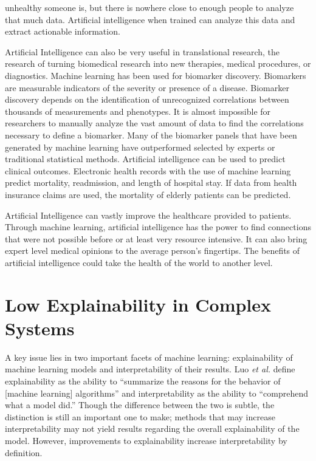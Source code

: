\documentclass[]{article}
\begin{document}
unhealthy someone is, but there is nowhere close to enough people to analyze that much data. Artificial intelligence when trained can analyze this data and extract actionable information.\cite{reddy2019artificial}

		Artificial Intelligence can also be very useful in translational research, the research of turning biomedical research into new therapies, medical procedures, or diagnostics. Machine learning has been used for biomarker discovery. Biomarkers are measurable indicators of the severity or presence of a disease. Biomarker discovery depends on the identification of unrecognized correlations between thousands of measurements and phenotypes. It is almost impossible for researchers to manually analyze the vast amount of data to find the correlations necessary to define a biomarker. Many of the biomarker panels that have been generated by machine learning have outperformed selected by experts or traditional statistical methods. Artificial intelligence can be used to predict clinical outcomes. Electronic health records with the use of machine learning predict mortality, readmission, and length of hospital stay. If data from health insurance claims are used, the mortality of elderly patients can be predicted.\cite{reddy2019artificial}

		Artificial Intelligence can vastly improve the healthcare provided to patients. Through machine learning, artificial intelligence has the power to find connections that were not possible before or at least very resource intensive. It can also bring expert level medical opinions to the average person's fingertips. The benefits of artificial intelligence could take the health of the world to another level. 

	\section{Low Explainability in Complex Systems}
		A key issue lies in two important facets of machine learning: explainability of machine learning models and interpretability of their results. Luo \emph{et al.} define explainability as the ability to ``summarize the reasons for the behavior of [machine learning] algorithms'' and interpretability as the ability to ``comprehend what a model did.''\cite{doi:10.1259/bjro.20190021} Though the difference between the two is subtle, the distinction is still an important one to make; methods that may increase interpretability may not yield results regarding the overall explainability of the model. However, improvements to explainability increase interpretability by definition.
\end{document}
